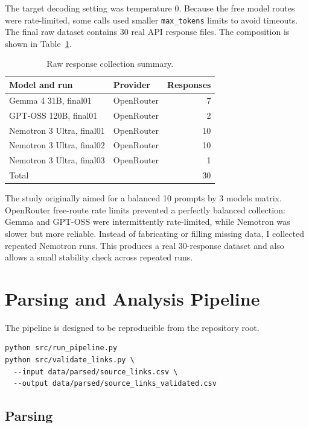 \documentclass[acmsmall,review,nonacm]{acmart}
\begin{document}
The target decoding setting was temperature 0. Because the free model routes
were rate-limited, some calls used smaller \texttt{max\_tokens} limits to avoid
timeouts. The final raw dataset contains 30 real API response files. The
composition is shown in Table~\ref{tab:collection}.

\begin{table}[h]
  \caption{Raw response collection summary.}
  \label{tab:collection}
  \centering
  \begin{tabular}{llr}
    \toprule
    Model and run & Provider & Responses \\
    \midrule
    Gemma 4 31B, final01 & OpenRouter & 7 \\
    GPT-OSS 120B, final01 & OpenRouter & 2 \\
    Nemotron 3 Ultra, final01 & OpenRouter & 10 \\
    Nemotron 3 Ultra, final02 & OpenRouter & 10 \\
    Nemotron 3 Ultra, final03 & OpenRouter & 1 \\
    \midrule
    Total & & 30 \\
    \bottomrule
  \end{tabular}
\end{table}

The study originally aimed for a balanced 10 prompts by 3 models matrix.
OpenRouter free-route rate limits prevented a perfectly balanced collection:
Gemma and GPT-OSS were intermittently rate-limited, while Nemotron was slower
but more reliable. Instead of fabricating or filling missing data, I collected
repeated Nemotron runs. This produces a real 30-response dataset and also
allows a small stability check across repeated runs.

\section{Parsing and Analysis Pipeline}

The pipeline is designed to be reproducible from the repository root.

\begin{verbatim}
python src/run_pipeline.py
python src/validate_links.py \
  --input data/parsed/source_links.csv \
  --output data/parsed/source_links_validated.csv
\end{verbatim}

\subsection{Parsing}
\end{document}
